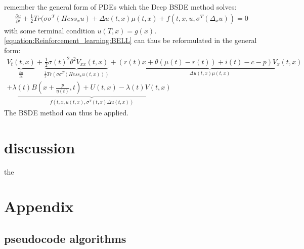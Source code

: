 \documentclass[letterpaper,10pt,english]{jupyterBook}
\begin{document}
\sphinxAtStartPar
remember the general form of PDEs which the Deep BSDE method solves:
\begin{equation}\label{equation:Financial_application:gen_form}
\begin{split}\frac{\partial u}{\partial t} + \frac{1}{2} Tr(\sigma \sigma^T (Hess_xu) + \Delta u(t,x)  \mu(t,x) + f(t,x,u, \sigma^T(\Delta_x u)) = 0 \end{split}
\end{equation}
\sphinxAtStartPar
with some terminal condition \(u(T,x) = g(x)\). \eqref{equation:Reinforcement_learning:BELL} can thus be reformulated in the general form:
\begin{equation*}
\begin{split}\underbrace{V_t(t,x)}_{\frac{\partial u}{\partial t}} + \underbrace{\frac{1}{2}\sigma(t)^2\theta^2V_{xx}(t,x)}_{\frac{1}{2}Tr(\sigma \sigma^T(Hess_xu(t,x)))} + \underbrace{(r(t) x + \theta(\mu(t) -r(t)) + i(t) -c -p)V_x(t,x)}_{\Delta u(t,x)\mu (t,x)} \\ + \underbrace{\lambda(t)B(x+\frac{p}{\eta(t)},t) + U(t,x) - \lambda(t)V(t,x)}_{f(t,x,u(t,x), \sigma^T(t,x)\Delta u(t,x))}\end{split}
\end{equation*}
\sphinxAtStartPar
The BSDE method can thus be applied.


\chapter{discussion}
\label{\detokenize{Discussion:discussion}}\label{\detokenize{Discussion::doc}}
\sphinxAtStartPar
the

\sphinxAtStartPar



\chapter{Appendix}
\label{\detokenize{Appendix:appendix}}\label{\detokenize{Appendix::doc}}

\section{pseudocode algorithms}
\label{\detokenize{Appendix:pseudocode-algorithms}}
\sphinxAtStartPar
{}

\sphinxAtStartPar
{}
\end{document}
